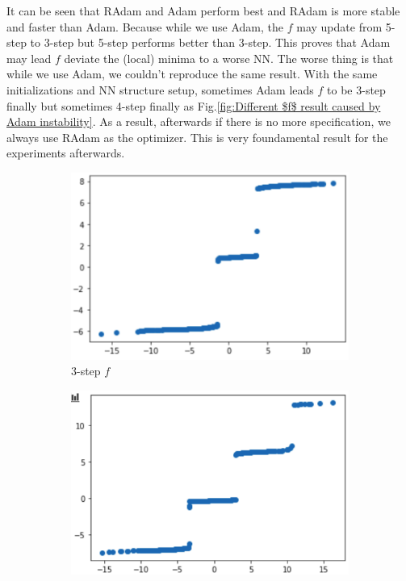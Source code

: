 \documentclass[conference,compsoc]{IEEEtran}
\begin{document}
  It can be seen that RAdam and Adam perform best and RAdam is more stable and faster than Adam. Because while we use Adam, the $f$ may update from 5-step to 3-step but 5-step performs better than 3-step. This proves that Adam may lead $f$ deviate the (local) minima to a worse NN. The worse thing is that while we use Adam, we couldn't reproduce the same result. With the same initializations and NN structure setup, sometimes Adam leads $f$ to be 3-step finally but sometimes 4-step finally as Fig.\ref{fig:Different $f$ result caused by Adam instability}. As a result, afterwards if there is no more specification, we always use RAdam as the optimizer. This is very foundamental result for the experiments afterwards.\\
  
  \begin{figure}
    \centering
        \begin{subfigure}[b]{0.2\textwidth}            
                \includegraphics[width=\textwidth]{images/3-step-Adam.png}
                \caption{3-step $f$}
                \label{fig:3-step f}
        \end{subfigure}%
        \begin{subfigure}[b]{0.2\textwidth}
                \centering
                \includegraphics[width=\textwidth]{images/4-step-Adam.png}

\end{subfigure}
\end{figure}
\end{document}

